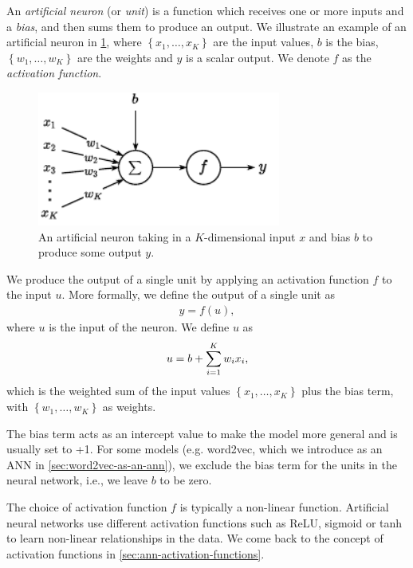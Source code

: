 An \textit{artificial neuron} (or \textit{unit}) is a function which receives one or more inputs and a \textit{bias}, and then sums them to produce an output. We illustrate an example of an artificial neuron in \cref{fig:artificial_neuron}, where $\left\{ x_1, \ldots, x_K \right\}$ are the input values, $b$ is the bias, $\left\{ w_1, \ldots, w_K \right\}$ are the weights and $y$ is a scalar output. We denote $f$ as the \textit{activation function}.
\begin{figure}[H]
    \centering
    \includegraphics[width=8cm]{thesis/figures/artificial-neuron_cropped.pdf}
    \caption{An artificial neuron taking in a $K$-dimensional input $x$ and bias $b$ to produce some output $y$.}
    \label{fig:artificial_neuron}
\end{figure}

We produce the output of a single unit by applying an activation function $f$ to the input $u$. More formally, we define the output of a single unit as
\begin{align}
    y = f(u),
\end{align}
where $u$ is the input of the neuron. We define $u$ as
\begin{align}
    u = b + \sum\limits_{i=1}^{K} w_i x_i,
\end{align}
which is the weighted sum of the input values $\left\{ x_1, \ldots, x_K \right\}$ plus the bias term, with $\left\{ w_1, \ldots, w_K \right\}$ as weights.

The bias term acts as an intercept value to make the model more general and is usually set to +1. For some models (e.g. word2vec, which we introduce as an ANN in \cref{sec:word2vec-as-an-ann}), we exclude the bias term for the units in the neural network, i.e., we leave $b$ to be zero.

The choice of activation function $f$ is typically a non-linear function. Artificial neural networks use different activation functions such as ReLU, sigmoid or tanh to learn non-linear relationships in the data. We come back to the concept of activation functions in \cref{sec:ann-activation-functions}.

